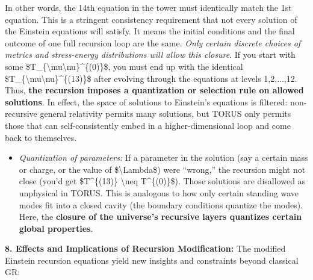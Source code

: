 \documentclass[
]{article}
\begin{document}
{In other words, the 14th equation in the tower must identically match
the 1st equation. This is a stringent consistency requirement that not
every solution of the Einstein equations will satisfy. It means the
initial conditions and the final outcome of one full recursion loop are
the same. \emph{Only certain discrete choices of metrics and
stress-energy distributions will allow this closure}. If you start with
some \$T\_\{\textbackslash mu\textbackslash nu\}\^{}\{(0)\}\$, you must
end up with the identical
\$T\_\{\textbackslash mu\textbackslash nu\}\^{}\{(13)\}\$ after evolving
through the equations at levels 1,2,...,12. Thus, \textbf{the recursion
imposes a quantization or selection rule on allowed
solutions}\hspace{0pt}. In effect, the space of solutions to Einstein's
equations is filtered: non-recursive general relativity permits many
solutions, but TORUS only permits those that can self-consistently embed
in a higher-dimensional loop and come back to themselves.

\begin{itemize}
\item
  \emph{Quantization of parameters:} If a parameter in the solution (say
  a certain mass or charge, or the value of \$\textbackslash Lambda\$)
  were ``wrong,'' the recursion might not close (you'd get
  \$T\^{}\{(13)\} \textbackslash neq T\^{}\{(0)\}\$). Those solutions
  are disallowed as unphysical in TORUS. This is analogous to how only
  certain standing wave modes fit into a closed cavity (the boundary
  conditions quantize the modes). Here, the \textbf{closure of the
  universe's recursive layers quantizes certain global properties}.
\end{itemize}

\textbf{8. Effects and Implications of Recursion Modification:} The
modified Einstein recursion equations yield new insights and constraints
beyond classical GR:

}
\end{document}
